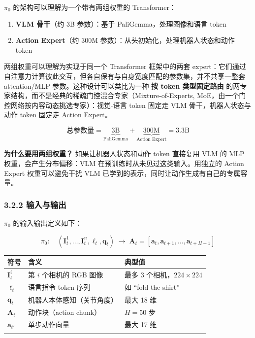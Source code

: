 \documentclass[
  chinese,
]{ctexart}
\providecommand{\tightlist}{%
  \setlength{\itemsep}{0pt}\setlength{\parskip}{0pt}}
\begin{document}
\(\pi_0\) 的架构可以理解为一个带有两组权重的 Transformer：

\begin{enumerate}
\def\labelenumi{\arabic{enumi}.}
\tightlist
\item
  \textbf{VLM 骨干}（约 3B 参数）：基于 PaliGemma，处理图像和语言 token
\item
  \textbf{Action Expert}（约 300M
  参数）：从头初始化，处理机器人状态和动作 token
\end{enumerate}

两组权重可以理解为实现于同一个 Transformer 框架中的两套
expert：它们通过自注意力计算彼此交互，但各自保有与自身宽度匹配的参数集，并不共享一整套
attention/MLP 参数。这种设计可以类比为一种 \textbf{按 token
类型固定路由}
的两专家结构，而不是经典的稀疏门控混合专家（Mixture-of-Experts,
MoE，由一个门控网络按内容动态挑选专家）：视觉-语言 token 固定走 VLM
骨干，机器人状态与动作 token 固定走 Action Expert。

\[
\text{总参数量} = \underbrace{3\text{B}}_{\text{PaliGemma}} + \underbrace{300\text{M}}_{\text{Action Expert}} = 3.3\text{B}
\]

\textbf{为什么要用两组权重？} 如果让机器人状态和动作 token 直接复用 VLM
的 MLP 权重，会产生分布偏移：VLM 在预训练时从未见过这类输入。用独立的
Action Expert 权重可以避免干扰 VLM
已学到的表示，同时让动作生成有自己的专属容量。

\subsubsection{3.2.2 输入与输出}\label{ux8f93ux5165ux4e0eux8f93ux51fa}

\(\pi_0\) 的输入输出定义如下：

\[
\pi_0: \quad (\mathbf{I}^1_t, \ldots, \mathbf{I}^n_t, \ell_t, \mathbf{q}_t) \;\longrightarrow\; \mathbf{A}_t = [\mathbf{a}_t, \mathbf{a}_{t+1}, \ldots, \mathbf{a}_{t+H-1}]
\]

\begin{center}
\begin{tabular}{@{}>{\raggedright\arraybackslash}p{} >{\raggedright\arraybackslash}p{} >{\raggedright\arraybackslash}p{}@{}}
\toprule\noalign{}
符号 & 含义 & 典型值 \\
\midrule\noalign{}
\(\mathbf{I}^i_t\) & 第 \(i\) 个相机的 RGB 图像 & 最多 3 个相机，\(224 \times 224\) \\
\(\ell_t\) & 语言指令 token 序列 & 如 ``fold the shirt'' \\
\(\mathbf{q}_t\) & 机器人本体感知（关节角度） & 最大 18 维 \\
\(\mathbf{A}_t\) & 动作块（action chunk） & \(H = 50\) 步 \\
\(\mathbf{a}_{t'}\) & 单步动作向量 & 最大 17 维 \\
\bottomrule\noalign{}
\end{tabular}
\end{center}
\end{document}
